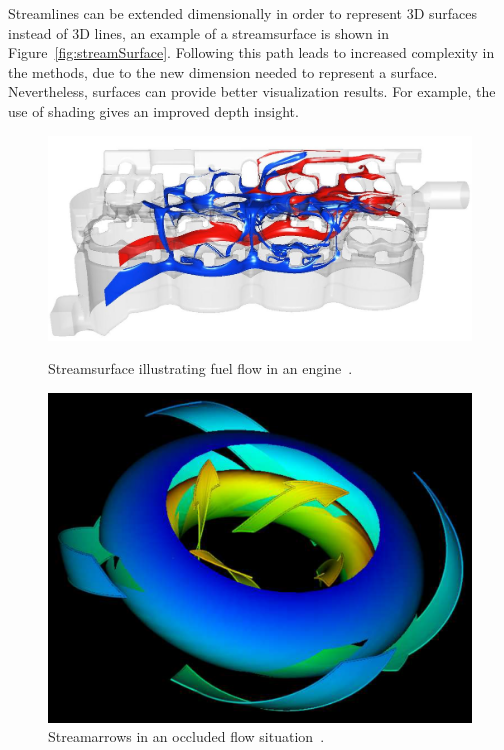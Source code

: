 Streamlines can be extended dimensionally in order to represent 3D surfaces instead of 3D lines, an example of a streamsurface is shown in Figure~\ref{fig:streamSurface}.
Following this path leads to increased complexity in the methods, due to the new dimension needed to represent a surface.
Nevertheless, surfaces can provide better visualization results.
For example, the use of shading gives an improved depth insight.

\begin{figure}[htbp]
	\centering
	\begin{minipage}[t]{.45\textwidth}
		\centering
		\includegraphics[width=1.05\textwidth]{images/streamSurface}
		\caption{Streamsurface illustrating fuel flow in an engine~\cite{Laramee2005a}.}
		\label{fig:streamSurface}
	\end{minipage}\qquad
	\begin{minipage}[t]{.45\textwidth}
		\centering
		\includegraphics[width=.8\textwidth]{images/streamArrows2}
		\caption{Streamarrows in an occluded flow situation~\cite{Loffelmann1997}.}
		\label{fig:streamArrows2}
	\end{minipage}
\end{figure}

